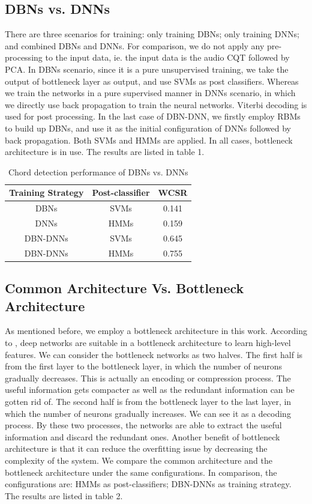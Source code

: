 \documentclass{article}
\begin{document}
\subsection{DBNs vs. DNNs}
There are three scenarios for training: only training DBNs; only training DNNs; and combined DBNs and DNNs. For comparison, we do not apply any pre-processing to the input data, ie. the input data is the audio CQT followed by PCA. In DBNs scenario, since it is a pure unsupervised training, we take the output of bottleneck layer as output, and use SVMs as post classifiers. Whereas we train the networks in a pure supervised manner in DNNs scenario, in which we directly use back propagation to train the neural networks. Viterbi decoding is used for post processing. In the last case of DBN-DNN, we firstly employ RBMs to build up DBNs, and use it as the initial configuration of DNNs followed by back propagation. Both SVMs and HMMs are applied. In all cases, bottleneck architecture is in use. The results are listed in table 1. 

\begin{table}[h]
\begin{tabular}{|c|c|c|}
\hline
Training Strategy & Post-classifier & WCSR  \\ \hline
DBNs              & SVMs            & 0.141 \\ \hline
DNNs              & HMMs            & 0.159      \\ \hline
DBN-DNNs          & SVMs            & 0.645 \\ \hline
DBN-DNNs          & HMMs            & 0.755 \\ \hline
\end{tabular}
\caption{Chord detection performance of DBNs vs. DNNs}
\end{table}

\subsection{Common Architecture Vs. Bottleneck Architecture}
As mentioned before, we employ a bottleneck architecture in this work. According to \cite{grezl2007probabilistic}, deep networks are suitable in a bottleneck architecture to learn high-level features. We can consider the bottleneck networks as two halves. The first half is from the first layer to the bottleneck layer, in which the number of neurons gradually decreases. This is actually an encoding or compression process. The useful information gets compacter as well as the redundant information can be gotten rid of. The second half is from the bottleneck layer to the last layer, in which the number of neurons gradually increases. We can see it as a decoding process. By these two processes, the networks are able to extract the useful information and discard the redundant ones. Another benefit of bottleneck architecture is that it can reduce the overfitting issue by decreasing the complexity of the system. We compare the common architecture and the bottleneck architecture under the same configurations. In comparison, the configurations are: HMMs as post-classifiers; DBN-DNNs as training strategy. The results are listed in table 2.
\end{document}
